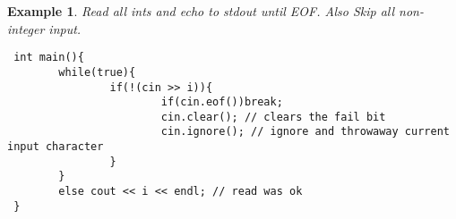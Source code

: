 \documentclass{article}
\newtheorem{ex}[theorem]{Example}
\begin{document}
 \begin{ex}
 Read all ints and echo to stdout until EOF. Also Skip all non-integer input.
 \begin{lstlisting}
 int main(){
 		while(true){
 				if(!(cin >> i)){
 						if(cin.eof())break;
 						cin.clear(); // clears the fail bit
 						cin.ignore(); // ignore and throwaway current input character 
 				}
 		}
 		else cout << i << endl; // read was ok
 }
 \end{lstlisting}
 
 \end{ex}
\end{document}

